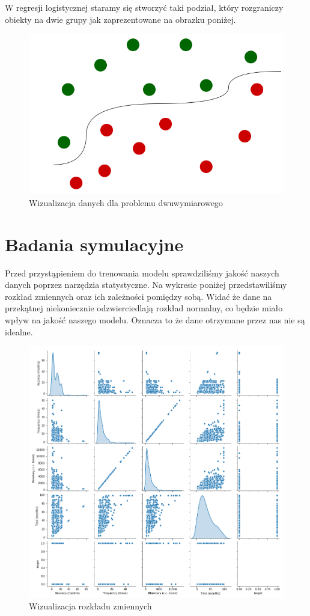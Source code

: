 \documentclass[11pt, a4paper, notitlepage]{report}
\begin{document}
W regresji logistycznej staramy się stworzyć taki podział, który rozgraniczy obiekty na dwie grupy jak zaprezentowane na obrazku poniżej.

\begin{figure}[h!]
  \includegraphics[scale=0.5]{graphics/logistic}
  \caption{Wizualizacja danych dla problemu dwuwymiarowego}
  \label{fig:gradient}
\end{figure}
\newpage

\section{Badania symulacyjne}
Przed przystąpieniem do trenowania modelu sprawdziliśmy jakość naszych danych poprzez narzędzia statystyczne. Na wykresie poniżej przedstawiliśmy rozkład zmiennych oraz ich zależności pomiędzy sobą. Widać że dane na przekątnej niekoniecznie odzwierciedlają rozkład normalny, co będzie miało wpływ na jakość naszego modelu. Oznacza to że dane otrzymane przez nas nie są idealne.

 \begin{figure}[h!]
  \includegraphics[scale=0.5]{graphics/distribution}
  \caption{Wizualizacja rozkładu zmiennych}
  \label{fig:distribution}
\end{figure}
\end{document}
